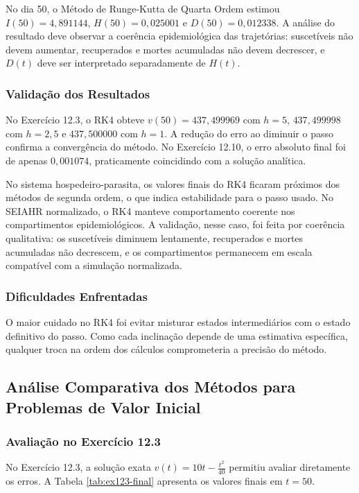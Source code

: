 No dia 50, o Método de Runge-Kutta de Quarta Ordem estimou \(I(50)=4{,}891144\), \(H(50)=0{,}025001\) e \(D(50)=0{,}012338\). A análise do resultado deve observar a coerência epidemiológica das trajetórias: suscetíveis não devem aumentar, recuperados e mortes acumuladas não devem decrescer, e \(D(t)\) deve ser interpretado separadamente de \(H(t)\).

\subsubsection{Validação dos Resultados}

No Exercício 12.3, o RK4 obteve \(v(50)=437{,}499969\) com \(h=5\), \(437{,}499998\) com \(h=2{,}5\) e \(437{,}500000\) com \(h=1\). A redução do erro ao diminuir o passo confirma a convergência do método. No Exercício 12.10, o erro absoluto final foi de apenas \(0{,}001074\), praticamente coincidindo com a solução analítica.

No sistema hospedeiro-parasita, os valores finais do RK4 ficaram próximos dos métodos de segunda ordem, o que indica estabilidade para o passo usado. No SEIAHR normalizado, o RK4 manteve comportamento coerente nos compartimentos epidemiológicos. A validação, nesse caso, foi feita por coerência qualitativa: os suscetíveis diminuem lentamente, recuperados e mortes acumuladas não decrescem, e os compartimentos permanecem em escala compatível com a simulação normalizada.

\subsubsection{Dificuldades Enfrentadas}

O maior cuidado no RK4 foi evitar misturar estados intermediários com o estado definitivo do passo. Como cada inclinação depende de uma estimativa específica, qualquer troca na ordem dos cálculos comprometeria a precisão do método.

\subsection{Análise Comparativa dos Métodos para Problemas de Valor Inicial}

\subsubsection{Avaliação no Exercício 12.3}

No Exercício 12.3, a solução exata \(v(t)=10t-\frac{t^2}{40}\) permitiu avaliar diretamente os erros. A Tabela \ref{tab:ex123-final} apresenta os valores finais em \(t=50\).

